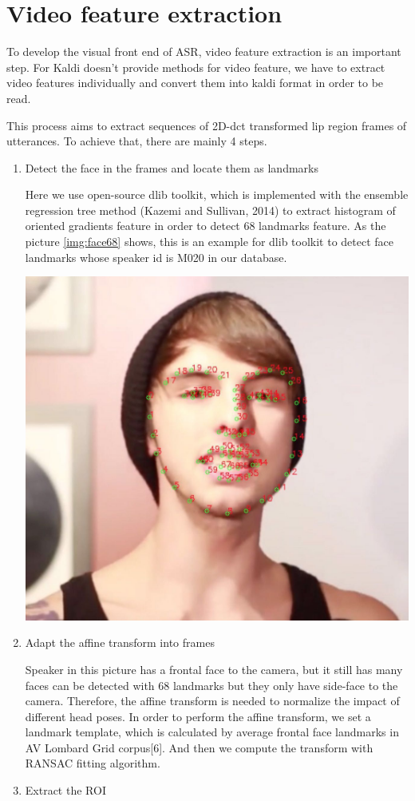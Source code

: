 \section{Video feature extraction}

To develop the visual front end of ASR, video feature extraction is an important step. For Kaldi doesn’t provide methods for video feature, we have to extract video features individually and convert them into kaldi format in order to be read.

This process aims to extract sequences of 2D-dct transformed lip region frames of utterances. To achieve that, there are mainly 4 steps. 
\begin{enumerate}
\item  Detect the face in the frames and locate them as landmarks

Here we use open-source dlib toolkit, which is implemented with the ensemble regression tree method (Kazemi and Sullivan, 2014) to extract histogram of oriented gradients feature in order to detect 68 landmarks feature. As the picture \ref{img:face68} shows, this is an example for dlib toolkit to detect face landmarks whose speaker id is M020 in our database.

\begin{center}
\includegraphics[width=0.5\linewidth]{images/face68.jpg}
\label{img:face68}
\end{center}
\item Adapt the affine transform into frames

Speaker in this picture has a frontal face to the camera, but it still has many faces can be detected with 68 landmarks but they only have side-face to the camera. Therefore, the affine transform is needed to normalize the impact of different head poses. In order to perform the affine transform, we set a landmark template, which is calculated by average frontal face landmarks in AV Lombard Grid corpus[6]. And then we compute the transform with RANSAC fitting algorithm.
\item Extract the ROI


\end{enumerate}
